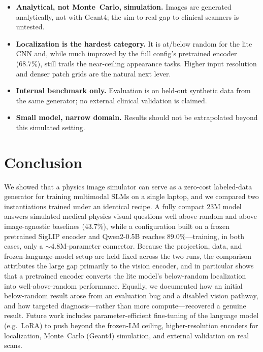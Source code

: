 \documentclass[11pt]{article}
\begin{document}
\begin{itemize}[leftmargin=*]
    \item \textbf{Analytical, not Monte~Carlo, simulation.} Images are generated
    analytically, not with Geant4; the sim-to-real gap to clinical scanners is
    untested.
    \item \textbf{Localization is the hardest category.} It is at/below random
    for the lite CNN and, while much improved by the full config's pretrained
    encoder (68.7\%), still trails the near-ceiling appearance tasks. Higher
    input resolution and denser patch grids are the natural next lever.
    \item \textbf{Internal benchmark only.} Evaluation is on held-out synthetic
    data from the same generator; no external clinical validation is claimed.
    \item \textbf{Small model, narrow domain.} Results should not be extrapolated
    beyond this simulated setting.
\end{itemize}

\section{Conclusion}
\label{sec:conclusion}

We showed that a physics image simulator can serve as a zero-cost labeled-data
generator for training multimodal SLMs on a single laptop, and we compared two
instantiations trained under an identical recipe. A fully compact 23M model
answers simulated medical-physics visual questions well above random and above
image-agnostic baselines (43.7\%), while a configuration built on a frozen
pretrained SigLIP encoder and Qwen2-0.5B reaches 89.0\%---training, in both cases,
only a $\sim$4.8M-parameter connector. Because the projection, data, and
frozen-language-model setup are held fixed across the two runs, the comparison
attributes the large gap primarily to the vision encoder, and in particular shows
that a pretrained encoder converts the lite model's below-random localization
into well-above-random performance. Equally, we documented how an initial
below-random result arose from an evaluation bug and a disabled vision pathway,
and how targeted diagnosis---rather than more compute---recovered a genuine
result. Future work includes parameter-efficient fine-tuning of the language
model (e.g.\ LoRA) to push beyond the frozen-LM ceiling, higher-resolution
encoders for localization, Monte~Carlo (Geant4) simulation, and external
validation on real scans.
\end{document}
